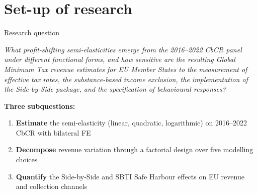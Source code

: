 \documentclass[aspectratio=169, 11pt]{beamer}
\newcommand{\highlight}[1]{\textcolor{DkOrange}{\textbf{#1}}}
\begin{document}
\section{Set-up of research}

\begin{frame}{Research question}
\begin{alertblock}{}
\itshape
What profit-shifting semi-elasticities emerge from the 2016--2022 CbCR panel under different functional forms, and how sensitive are the resulting Global Minimum Tax revenue estimates for EU Member States to the measurement of effective tax rates, the substance-based income exclusion, the implementation of the Side-by-Side package, and the specification of behavioural responses?
\end{alertblock}

\vspace{0.8em}
\textbf{Three subquestions:}
\begin{enumerate}
  \item \highlight{Estimate} the semi-elasticity (linear, quadratic, logarithmic) on 2016--2022 CbCR with bilateral FE
  \item \highlight{Decompose} revenue variation through a factorial design over five modelling choices
  \item \highlight{Quantify} the Side-by-Side and SBTI Safe Harbour effects on EU revenue and collection channels
\end{enumerate}
\end{frame}
\end{document}
